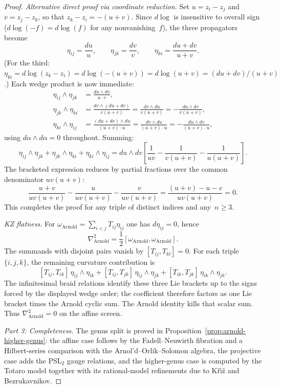 \begin{proof}
\emph{Alternative direct proof via coordinate reduction.} Set $u = z_i - z_j$ and $v = z_j - z_k$, so that $z_k - z_i = -(u+v)$. Since $d\log$ is insensitive to overall sign ($d\log(-f) = d\log(f)$ for any nonvanishing~$f$), the three propagators become
\[
\eta_{ij} = \frac{du}{u}, \qquad \eta_{jk} = \frac{dv}{v}, \qquad \eta_{ki} = \frac{du + dv}{u + v}.
\]
(For the third: $\eta_{ki} = d\log(z_k - z_i) = d\log(-(u+v)) = d\log(u+v) = (du+dv)/(u+v)$.) Each wedge product is now immediate:
\begin{align*}
\eta_{ij} \wedge \eta_{jk} &= \frac{du \wedge dv}{u \cdot v}, \\[4pt]
\eta_{jk} \wedge \eta_{ki} &= \frac{dv \wedge (du + dv)}{v(u+v)} = \frac{dv \wedge du}{v(u+v)} = -\frac{du \wedge dv}{v(u+v)}, \\[4pt]
\eta_{ki} \wedge \eta_{ij} &= \frac{(du+dv) \wedge du}{(u+v) \cdot u} = \frac{dv \wedge du}{(u+v) \cdot u} = -\frac{du \wedge dv}{(u+v) \cdot u},
\end{align*}
using $d\alpha \wedge d\alpha = 0$ throughout. Summing:
\[
\eta_{ij} \wedge \eta_{jk} + \eta_{jk} \wedge \eta_{ki} + \eta_{ki} \wedge \eta_{ij}
= du \wedge dv \left[\frac{1}{uv} - \frac{1}{v(u+v)} - \frac{1}{u(u+v)}\right].
\]
The bracketed expression reduces by partial fractions over the common denominator $uv(u+v)$:
\[
\frac{u+v}{uv(u+v)} - \frac{u}{uv(u+v)} - \frac{v}{uv(u+v)} = \frac{(u+v) - u - v}{uv(u+v)} = 0.
\]
This completes the proof for any triple of distinct indices and any~$n \geq 3$.

\emph{KZ flatness.}
For
$\omega_{\mathrm{Arnold}}=\sum_{i<j}T_{ij}\eta_{ij}$ one has
$d\eta_{ij}=0$, hence
\[
\nabla_{\mathrm{Arnold}}^2
=\frac12[\omega_{\mathrm{Arnold}},\omega_{\mathrm{Arnold}}].
\]
The summands with disjoint pairs vanish by
$[T_{ij},T_{kl}]=0$. For each triple $\{i,j,k\}$, the remaining
curvature contribution is
\[
[T_{ij},T_{ik}]\,\eta_{ij}\wedge\eta_{ik}
+[T_{ij},T_{jk}]\,\eta_{ij}\wedge\eta_{jk}
+[T_{ik},T_{jk}]\,\eta_{ik}\wedge\eta_{jk}.
\]
The infinitesimal braid relations identify these three Lie brackets up
to the signs forced by the displayed wedge order; the coefficient
therefore factors as one Lie bracket times the Arnold cyclic sum. The
Arnold identity kills that scalar sum. Thus
$\nabla_{\mathrm{Arnold}}^2=0$ on the affine screen.

\emph{Part 3: Completeness.}
The genus split is proved in
Proposition~\ref{prop:arnold-higher-genus}: the affine case follows by
the Fadell--Neuwirth fibration and a Hilbert-series comparison with the
Arnol'd--Orlik--Solomon algebra, the projective case adds the
$\mathrm{PSL}_2$ gauge relations, and the higher-genus case is computed
by the Totaro model \cite[Theorems~1 and~3]{Totaro96} together with its
rational-model refinements due to K\v{r}\'{\i}\v{z} and
Bezrukavnikov.
\end{proof}

